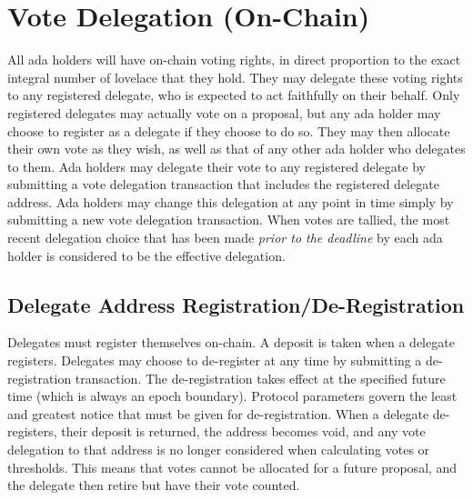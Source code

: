 \newpage
\section{Vote Delegation (On-Chain)}
\label{sect:delegation}

All ada holders will have on-chain voting rights, in direct proportion to the exact integral number of lovelace that they hold.
They may delegate these voting rights to any registered delegate, who is expected to act faithfully on their behalf.
Only registered delegates may actually vote on a proposal, but any ada holder may choose to register as a delegate if they choose to do so.
They may then allocate their own vote as they wish, as well as that of any other ada holder who delegates to them.
Ada holders may delegate their
vote to any registered delegate by submitting a vote delegation transaction that includes the registered delegate address.
Ada holders may change this delegation at any point in time simply by submitting a new vote delegation transaction.  When votes are tallied, the most recent delegation choice that has been made \emph{prior to the deadline} by each ada holder is considered to be the effective delegation.

\subsection{Delegate Address Registration/De-Registration}
\label{sect:registration}

Delegates must register themselves on-chain.
A deposit is taken when a delegate registers.  Delegates may choose to de-register at any time by submitting a de-registration transaction.  The de-registration takes effect
at the specified future time (which is always an epoch boundary).  Protocol parameters govern the least and greatest notice that must be given for de-registration.  When a delegate de-registers, their deposit is returned,
the address becomes void, and any vote delegation to that address is no longer considered when calculating votes or thresholds.  This means that votes cannot be allocated for a future proposal, and the delegate then
retire but have their vote counted.

